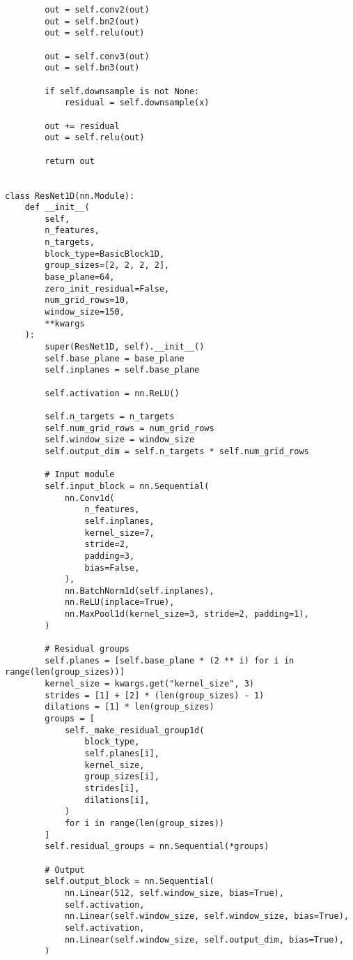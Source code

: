 \documentclass[
thesis  %
]{csthes}
\begin{document}
\begin{lstlisting}
        out = self.conv2(out)
        out = self.bn2(out)
        out = self.relu(out)

        out = self.conv3(out)
        out = self.bn3(out)

        if self.downsample is not None:
            residual = self.downsample(x)

        out += residual
        out = self.relu(out)

        return out


class ResNet1D(nn.Module):
    def __init__(
        self,
        n_features,
        n_targets,
        block_type=BasicBlock1D,
        group_sizes=[2, 2, 2, 2],
        base_plane=64,
        zero_init_residual=False,
        num_grid_rows=10,
        window_size=150,
        **kwargs
    ):
        super(ResNet1D, self).__init__()
        self.base_plane = base_plane
        self.inplanes = self.base_plane

        self.activation = nn.ReLU()

        self.n_targets = n_targets
        self.num_grid_rows = num_grid_rows
        self.window_size = window_size
        self.output_dim = self.n_targets * self.num_grid_rows

        # Input module
        self.input_block = nn.Sequential(
            nn.Conv1d(
                n_features,
                self.inplanes,
                kernel_size=7,
                stride=2,
                padding=3,
                bias=False,
            ),
            nn.BatchNorm1d(self.inplanes),
            nn.ReLU(inplace=True),
            nn.MaxPool1d(kernel_size=3, stride=2, padding=1),
        )

        # Residual groups
        self.planes = [self.base_plane * (2 ** i) for i in range(len(group_sizes))]
        kernel_size = kwargs.get("kernel_size", 3)
        strides = [1] + [2] * (len(group_sizes) - 1)
        dilations = [1] * len(group_sizes)
        groups = [
            self._make_residual_group1d(
                block_type,
                self.planes[i],
                kernel_size,
                group_sizes[i],
                strides[i],
                dilations[i],
            )
            for i in range(len(group_sizes))
        ]
        self.residual_groups = nn.Sequential(*groups)

        # Output
        self.output_block = nn.Sequential(
            nn.Linear(512, self.window_size, bias=True),
            self.activation,
            nn.Linear(self.window_size, self.window_size, bias=True),
            self.activation,
            nn.Linear(self.window_size, self.output_dim, bias=True),
        )


\end{lstlisting}
\end{document}
